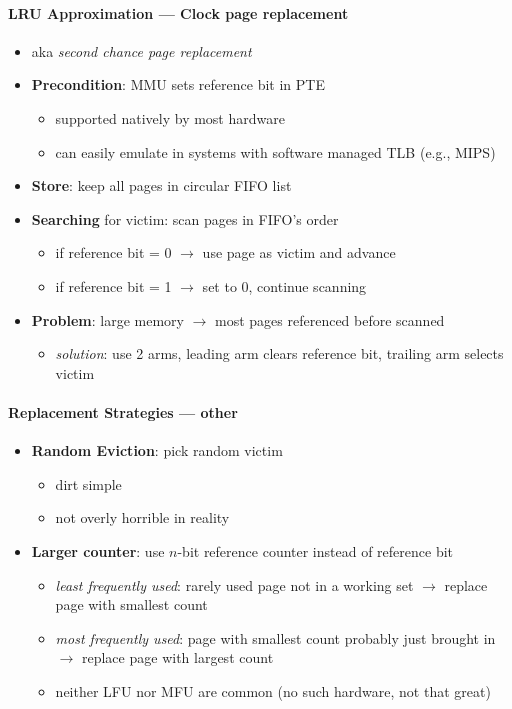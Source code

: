 \paragraph{LRU Approximation --- Clock page replacement}
\begin{itemize}
  \item aka \emph{second chance page replacement}
  \item \textbf{Precondition}: MMU sets reference bit in PTE
  \begin{itemize}
    \item supported natively by most hardware
    \item can easily emulate in systems with software managed TLB (e.g., MIPS)
  \end{itemize}
  \item \textbf{Store}: keep all pages in circular FIFO list
  \item \textbf{Searching} for victim: scan pages in FIFO's order
  \begin{itemize}
     \item if reference bit = 0 $ \to $ use page as victim and advance
     \item if reference bit = 1 $ \to $ set to 0, continue scanning
  \end{itemize}
  \item \textbf{Problem}: large memory $ \to $ most pages referenced before scanned
  \begin{itemize}
    \item \emph{solution}: use 2 arms, leading arm clears reference bit, trailing arm selects victim
  \end{itemize}
\end{itemize}

\paragraph{Replacement Strategies --- other}
\begin{itemize}
  \item \textbf{Random Eviction}: pick random victim
  \begin{itemize}
    \item dirt simple
    \item not overly horrible in reality
  \end{itemize}
  \item \textbf{Larger counter}: use $ n $-bit reference counter instead of reference bit
  \begin{itemize}
    \item \emph{least frequently used}: rarely used page not in a working set $ \to $ replace page with smallest count
    \item \emph{most frequently used}: page with smallest count probably just brought in $ \to $ replace page with largest count
    \item neither LFU nor MFU are common (no such hardware, not that great)
  \end{itemize}
\end{itemize}

